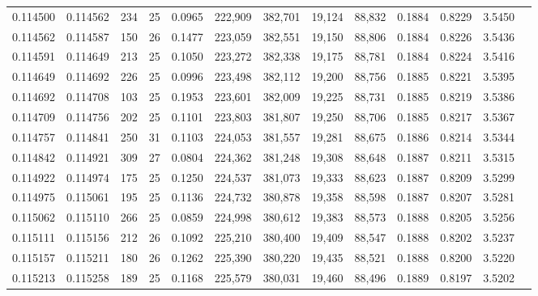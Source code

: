\begin{tabular}{rrrrrrrrrrrrr}
0.114500 & 0.114562 & 234 &  25 &                                     0.0965 & 222,909 & 382,701 &  19,124 &  88,832 & 0.1884 & 0.8229 & 3.5450 \\
0.114562 & 0.114587 & 150 &  26 &                                     0.1477 & 223,059 & 382,551 &  19,150 &  88,806 & 0.1884 & 0.8226 & 3.5436 \\
0.114591 & 0.114649 & 213 &  25 &                                     0.1050 & 223,272 & 382,338 &  19,175 &  88,781 & 0.1884 & 0.8224 & 3.5416 \\
0.114649 & 0.114692 & 226 &  25 &                                     0.0996 & 223,498 & 382,112 &  19,200 &  88,756 & 0.1885 & 0.8221 & 3.5395 \\
0.114692 & 0.114708 & 103 &  25 &                                     0.1953 & 223,601 & 382,009 &  19,225 &  88,731 & 0.1885 & 0.8219 & 3.5386 \\
0.114709 & 0.114756 & 202 &  25 &                                     0.1101 & 223,803 & 381,807 &  19,250 &  88,706 & 0.1885 & 0.8217 & 3.5367 \\
0.114757 & 0.114841 & 250 &  31 &                                     0.1103 & 224,053 & 381,557 &  19,281 &  88,675 & 0.1886 & 0.8214 & 3.5344 \\
0.114842 & 0.114921 & 309 &  27 &                                     0.0804 & 224,362 & 381,248 &  19,308 &  88,648 & 0.1887 & 0.8211 & 3.5315 \\
0.114922 & 0.114974 & 175 &  25 &                                     0.1250 & 224,537 & 381,073 &  19,333 &  88,623 & 0.1887 & 0.8209 & 3.5299 \\
0.114975 & 0.115061 & 195 &  25 &                                     0.1136 & 224,732 & 380,878 &  19,358 &  88,598 & 0.1887 & 0.8207 & 3.5281 \\
0.115062 & 0.115110 & 266 &  25 &                                     0.0859 & 224,998 & 380,612 &  19,383 &  88,573 & 0.1888 & 0.8205 & 3.5256 \\
0.115111 & 0.115156 & 212 &  26 &                                     0.1092 & 225,210 & 380,400 &  19,409 &  88,547 & 0.1888 & 0.8202 & 3.5237 \\
0.115157 & 0.115211 & 180 &  26 &                                     0.1262 & 225,390 & 380,220 &  19,435 &  88,521 & 0.1888 & 0.8200 & 3.5220 \\
0.115213 & 0.115258 & 189 &  25 &                                     0.1168 & 225,579 & 380,031 &  19,460 &  88,496 & 0.1889 & 0.8197 & 3.5202 \\

\end{tabular}
